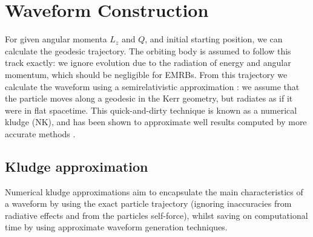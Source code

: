 \documentclass[useAMS,usedcolumn,usegraphicx,usenatbib]{mn2e}
\begin{document}
\section{Waveform Construction\label{sec:Kludge}}

For given angular momenta $L_z$ and $Q$, and initial starting position, we can calculate the geodesic trajectory. The orbiting body is assumed to follow this track exactly: we ignore evolution due to the radiation of energy and angular momentum, which should be negligible for EMRBs. From this trajectory we calculate the waveform using a semirelativistic approximation \citep{Ruffini1981}: we assume that the particle moves along a geodesic in the Kerr geometry, but radiates as if it were in flat spacetime. This quick-and-dirty technique is known as a numerical kludge (NK), and has been shown to approximate well results computed by more accurate methods \citep{Babak2007}.

\subsection{Kludge approximation}

Numerical kludge approximations aim to encapsulate the main characteristics of a waveform by using the exact particle trajectory (ignoring inaccuracies from radiative effects and from the particles self-force), whilst saving on computational time by using approximate waveform generation techniques.
\end{document}
